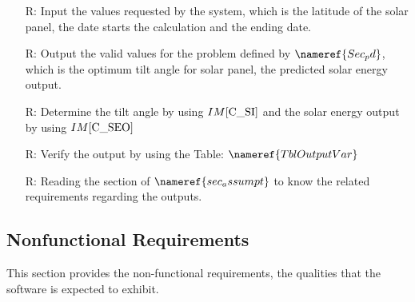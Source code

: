 \documentclass[12pt]{article}
\newcommand{\iref}[1]{IM\ref{#1}}
\newcounter{reqnum} %
\begin{document}
\noindent \begin{itemize}

\item[R\refstepcounter{reqnum}\thereqnum \label{R_Inputs}:] Input the values 
requested by the system, which is the latitude of the solar panel, the date starts the calculation and the ending date.

\item[R\refstepcounter{reqnum}\thereqnum \label{R_OutputInputs}:] Output the 
valid values for the problem defined by $\nameref{Sec_pd} $, which is the optimum 
tilt angle for solar panel, the predicted solar energy output.

\item[R\refstepcounter{reqnum}\thereqnum \label{R_Calculate}:] Determine the tilt angle 
by using $\iref{C_SI}$ and the solar energy output by using $\iref{C_SEO}$

\item[R\refstepcounter{reqnum}\thereqnum \label{R_VerifyOutput}:] Verify the output 
by using the Table: $\nameref{TblOutputVar}$

\item[R\refstepcounter{reqnum}\thereqnum \label{R_Output}:]Reading the section of 
$\nameref{sec_assumpt}$ to know the related requirements regarding the outputs.

\end{itemize}

\subsection{Nonfunctional Requirements}

This section provides the non-functional requirements, the qualities that the software is
expected to exhibit.
\end{document}
